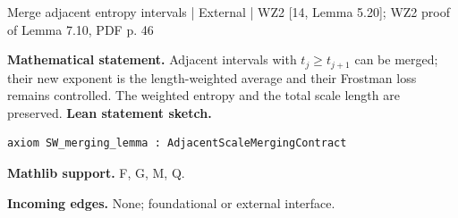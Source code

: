 \documentclass[10pt,a4paper]{article}
\newcommand{\sectitle}[1]{\clearpage{\sffamily\Large\bfseries\color{navy}#1}\par\medskip}
\begin{document}
\begin{minipage}{\linewidth}
\hypertarget{node-XSWmerge}{}
\begin{tcolorbox}[colback=white,colframe=externalfg,colbacktitle=externalbg,coltitle=ink,boxrule=0.45pt,arc=1.6mm,left=3mm,right=3mm,top=2mm,bottom=2mm,title={\sffamily\bfseries External: Shmerkin-Wang Lem. 5.20 \hfill \texttt{XSWmerge}}]
{\sffamily\small\color{muted}Merge adjacent entropy intervals | External | WZ2 [14, Lemma 5.20]; WZ2 proof of Lemma 7.10, PDF p. 46}\par
\textbf{Mathematical statement.} Adjacent intervals with $t_j\ge t_{j+1}$ can be merged; their new exponent is the length-weighted average and their Frostman loss remains controlled.
The weighted entropy and the total scale length are preserved.
\smallskip\textbf{Lean statement sketch.}
\begin{Verbatim}[fontsize=\small,breaklines=true,breakanywhere=true,tabsize=2]
axiom SW_merging_lemma : AdjacentScaleMergingContract
\end{Verbatim}
{\footnotesize\textbf{Mathlib support.} F, G, M, Q.\par
\textbf{Incoming edges.} None; foundational or external interface.\par}

\end{tcolorbox}\end{minipage}\par\medskip
\sectitle{Node catalogue: API}
\end{document}
